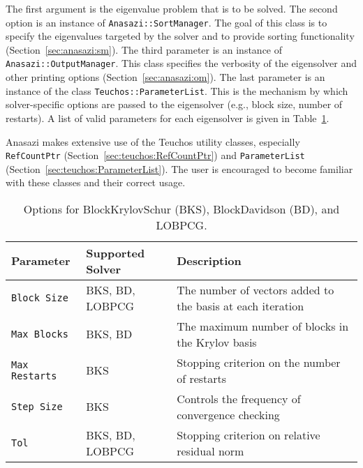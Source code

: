 The first argument is the eigenvalue problem that is to be solved. The second
option is an instance of \verb!Anasazi::SortManager!. The goal of this class is
to specify the eigenvalues targeted by the solver and to provide sorting
functionality (Section~\ref{sec:anasazi:sm}). The third parameter is an instance
of \verb!Anasazi::OutputManager!. This class specifies the verbosity of the
eigensolver and other printing options (Section~\ref{sec:anasazi:om}). The last
parameter is an instance of the class \verb!Teuchos::ParameterList!. This is the
mechanism by which solver-specific options are passed to the eigensolver (e.g.,
block size, number of restarts).  A list of valid parameters for each
eigensolver is given in Table~\ref{tab:anasazi:solver_params}.

\begin{remark}
Anasazi makes extensive use of the Teuchos utility classes, especially
\verb!RefCountPtr! (Section~\ref{sec:teuchos:RefCountPtr}) and
\verb!ParameterList! (Section~\ref{sec:teuchos:ParameterList}). The
user is encouraged to become familiar with these classes and their correct
usage.
\end{remark}

\begin{table}
\begin{center}
\begin{tabular}{| l | l | p{6cm} |}
\hline
Parameter & Supported Solver & Description \\
\hline
{\tt Block Size}   & BKS, BD, LOBPCG & The number of vectors added to the basis at each iteration \\
{\tt Max Blocks}   & BKS, BD         & The maximum number of blocks in the Krylov basis \\
{\tt Max Restarts} & BKS             & Stopping criterion on the number of restarts \\
{\tt Step Size}    & BKS             & Controls the frequency of convergence checking \\
{\tt Tol}          & BKS, BD, LOBPCG & Stopping criterion on relative residual norm \\
\hline
\end{tabular}
\caption{Options for BlockKrylovSchur (BKS), BlockDavidson (BD), and LOBPCG.}
\label{tab:anasazi:solver_params}
\end{center}
\end{table}

